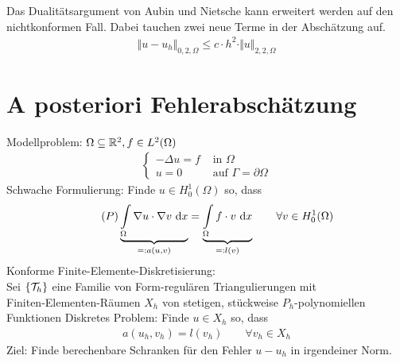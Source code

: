 \begin{bemerkung}
	Das Dualitätsargument von Aubin und Nietsche kann erweitert werden auf den nichtkonformen Fall. Dabei tauchen zwei neue Terme in der Abschätzung auf.
	\begin{align*}
		\big\Vert u-u_h\big\Vert_{0,2,\Omega}\leq c\cdot h^2\cdot\Vert u\Vert_{2,2,\Omega}
	\end{align*}
\end{bemerkung}

\section{A posteriori Fehlerabschätzung} %
Modellproblem: $\Omega\subseteq\mathbb{R}^2,f\in L^2(\Omega)$
\begin{align*}
	\left\lbrace\begin{array}{rl}
		-\Delta u=f &\text{ in }\Omega\\
		u=0 &\text{ auf }\Gamma=\partial\Omega
	\end{array}\right.
\end{align*}
Schwache Formulierung: Finde $u\in H_0^1(\Omega)$ so, dass
\begin{align*}\label{eqSection6P}\tag{$P$}
	\underbrace{\int\limits_\Omega\nabla u\cdot\nabla v\text{ d} x}_{=:a(u,v)}=\underbrace{\int\limits_\Omega f\cdot v\text{ d} x}_{=:l(v)}\qquad\forall v\in H_0^1(\Omega)
\end{align*}
Konforme Finite-Elemente-Diskretisierung:\\
Sei $\lbrace\mathcal{T}_h\rbrace$ eine Familie von Form-regulären Triangulierungen mit\\ Finiten-Elementen-Räumen $X_h$ von stetigen, stückweise $P_h$-polynomiellen Funktionen\nl
Diskretes Problem: Finde $u\in X_h$ so, dass
\begin{align}\label{eqSection6Ph}\tag{$P_h$}
	a(u_h,v_h)=l(v_h)\qquad\forall v_h\in X_h
\end{align}
Ziel: Finde berechenbare Schranken für den Fehler $u-u_h$ in irgendeiner Norm.


